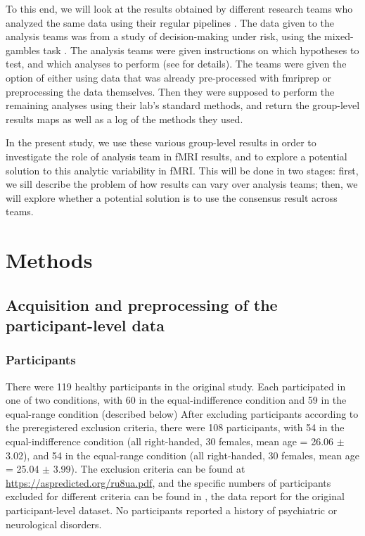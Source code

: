 \documentclass[a4paper,doc,natbib]{apa6}
\begin{document}
To this end, we will look at the results obtained by different research teams who analyzed the same data using their regular pipelines \citep{botvinik-nezer_fmri_2019}. The data given to the analysis teams was from a study of decision-making under risk, using the mixed-gambles task \cite{tom_neural_2007}. The analysis teams were given instructions on which hypotheses to test, and which analyses to perform (see \citealp{botvinik-nezer_fmri_2019} for details). The teams were given the option of either using data that was already pre-processed with fmriprep \citep{esteban2019fmriprep} or preprocessing the data themselves. Then they were supposed to perform the remaining analyses using their lab's standard methods, and return the group-level results maps as well as a log of the methods they used. 

In the present study, we use these various group-level results in order to investigate the role of analysis team in fMRI results, and to explore a potential solution to this analytic variability in fMRI. This will be done in two stages: first, we sill describe the problem of how results can vary over analysis teams; then, we will explore whether a potential solution is to use the consensus result across teams. 

\section{Methods} \label{sec:methods}

\subsection{Acquisition and preprocessing of the participant-level data}
\subsubsection{Participants}
There were 119 healthy participants in the original study. Each participated in one of two conditions, with 60 in the equal-indifference condition and 59 in the equal-range condition (described below) After excluding participants according to the preregistered exclusion criteria, there were 108 participants, with 54 in the equal-indifference condition (all right-handed, 30 females, mean age = 26.06 $\pm$ 3.02), and 54 in the equal-range condition (all right-handed, 30 females, mean age = 25.04 $\pm$ 3.99). The exclusion criteria can be found at \url{https://aspredicted.org/ru8ua.pdf}, and the specific numbers of participants excluded for different criteria can be found in \cite{botvinik-nezer_fmri_2019}, the data report for the original participant-level dataset. No participants reported a history of psychiatric or neurological disorders.
\end{document}
